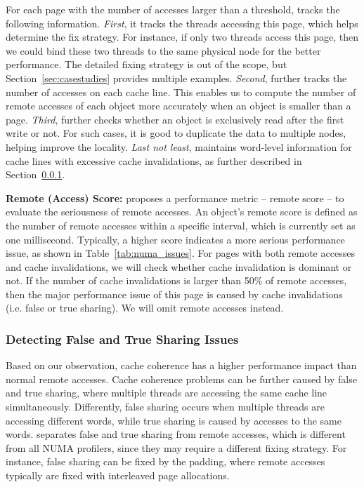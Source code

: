 For each page with the number of accesses larger than a threshold, \NP{} tracks the following information. \textit{First}, it tracks the threads accessing this page, which helps determine the fix strategy. For instance, if only two threads access this page, then we could bind these two threads to the same physical node for the better performance. The detailed fixing strategy is out of the scope, but Section~\ref{sec:casestudies} provides multiple examples. 
\textit{Second}, \NP{} further tracks the number of accesses on each cache line.  
This enables us to compute the number of remote accesses of each object more accurately when an object is smaller than a page. \textit{Third}, \NP{} further checks whether an object is exclusively read after the first write or not. For such cases, it is good to duplicate the data to multiple nodes, helping improve the locality. 
\textit{Last not least}, \NP{} maintains  word-level information for cache lines with excessive cache invalidations, as further described in Section~\ref{sec: cacheline}.

\textbf{Remote (Access) Score:} \NP{}  proposes a performance metric -- remote score -- to evaluate the seriousness of remote accesses. An object's remote score is defined as the number of remote accesses within a specific interval, which is currently set as one millisecond. Typically, a higher score indicates a more serious performance issue, as shown in Table~\ref{tab:numa_issues}. 
For pages with both remote accesses and cache invalidations, we will check whether cache invalidation is dominant or not. If the number of cache invalidations is larger than 50\% of remote accesses, then the major performance issue of this page is caused by cache invalidations (i.e. false or true sharing). We will omit remote accesses instead. 
 
\subsubsection{Detecting False and True Sharing Issues}
\label{sec: cacheline}

Based on our observation, cache coherence has a higher performance impact than normal remote accesses. Cache coherence problems can be further caused by false and true sharing, where multiple threads are accessing the same cache line simultaneously. Differently, false sharing occurs when multiple threads are accessing different words, while true sharing is caused by accesses to the same words. \NP{} separates false and true sharing from remote accesses, which is different from all NUMA profilers, since they may require a different fixing strategy. For instance, false sharing can be fixed by the padding,  where remote accesses typically are fixed with interleaved page allocations.

